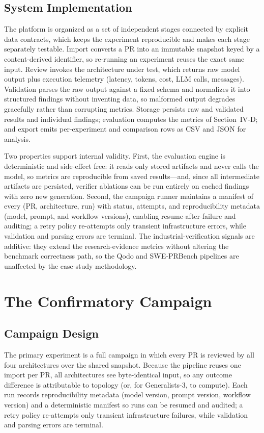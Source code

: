 \documentclass[conference]{IEEEtran}
\begin{document}
\subsection{System Implementation}
The platform is organized as a set of independent stages connected by
explicit data contracts, which keeps the experiment reproducible and makes
each stage separately testable. Import converts a PR into an immutable
snapshot keyed by a content-derived identifier, so re-running an experiment
reuses the exact same input. Review invokes the architecture under test,
which returns raw model output plus execution telemetry (latency, tokens,
cost, LLM calls, messages). Validation parses the raw output against a fixed
schema and normalizes it into structured findings without inventing data, so
malformed output degrades gracefully rather than corrupting metrics. Storage
persists raw and validated results and individual findings; evaluation
computes the metrics of Section~IV-D; and export emits per-experiment and
comparison rows as CSV and JSON for analysis.

Two properties support internal validity. First, the evaluation engine is
deterministic and side-effect free: it reads only stored artifacts and never
calls the model, so metrics are reproducible from saved results---and, since
all intermediate artifacts are persisted, verifier ablations can be run
entirely on cached findings with zero new generation. Second, the campaign
runner maintains a manifest of every (PR, architecture, run) with status,
attempts, and reproducibility metadata (model, prompt, and workflow
versions), enabling resume-after-failure and auditing; a retry policy
re-attempts only transient infrastructure errors, while validation and
parsing errors are terminal. The industrial-verification signals are
additive: they extend the research-evidence metrics without altering the
benchmark correctness path, so the Qodo and SWE-PRBench pipelines are
unaffected by the case-study methodology.

\section{The Confirmatory Campaign}

\subsection{Campaign Design}
The primary experiment is a full campaign in which every PR is reviewed by
all four architectures over the shared snapshot. Because the pipeline reuses
one import per PR, all architectures see byte-identical input, so any
outcome difference is attributable to topology (or, for Generalists-3, to
compute). Each run records reproducibility metadata (model version, prompt
version, workflow version) and a deterministic manifest so runs can be
resumed and audited; a retry policy re-attempts only transient
infrastructure failures, while validation and parsing errors are terminal.
\end{document}
